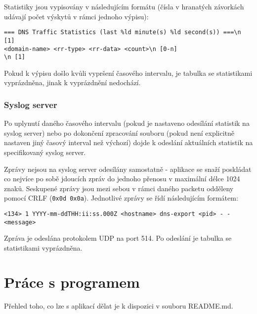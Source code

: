 \documentclass[11pt]{article}
\begin{document}
	Statistiky jsou vypisovány v následujícím formátu (čísla v hranatých závorkách udávají počet výskytů v rámci jednoho výpisu):
	\begin{verbatim}
=== DNS Traffic Statistics (last %ld minute(s) %ld second(s)) ===\n [1]
<domain-name> <rr-type> <rr-data> <count>\n [0-n]
\n [1]
	\end{verbatim}
	
	Pokud k výpisu došlo kvůli vypršení časového intervalu, je tabulka se statistikami vyprázdněna, jinak k vyprázdnění nedochází.
	
	\subsubsection{Syslog server}
	Po uplynutí daného časového intervalu (pokud je nastaveno odesílání statistik na syslog server) nebo po dokončení zpracování souboru (pokud není explicitně nastaven jiný časový interval než výchozí) dojde k odeslání aktuálních statistik na specifikovaný syslog server.
	
	Zprávy nejsou na syslog server odesílány samostatně - aplikace se snaží poskládat co nejvíce po sobě jdoucích zpráv do jednoho přenosu v maximální délce 1024 znaků.
	Seskupené zprávy jsou mezi sebou v rámci daného packetu odděleny pomocí CRLF (\texttt{0x0d 0x0a}).
	Jednotlivé zprávy se řídí následujícím formátem:
	\begin{verbatim}
<134> 1 YYYY-mm-ddTHH:ii:ss.000Z <hostname> dns-export <pid> - - <message>
	\end{verbatim}
	
	Zpráva je odeslána protokolem UDP na port 514\cite{RFC5424}.
	Po odeslání je tabulka se statistikami vyprázdněna.
	
	
	\section{Práce s programem}
	Přehled toho, co lze s aplikací dělat je k dispozici v souboru \textsf{README.md}.
	
	\newpage
	
	
	
\end{document}
